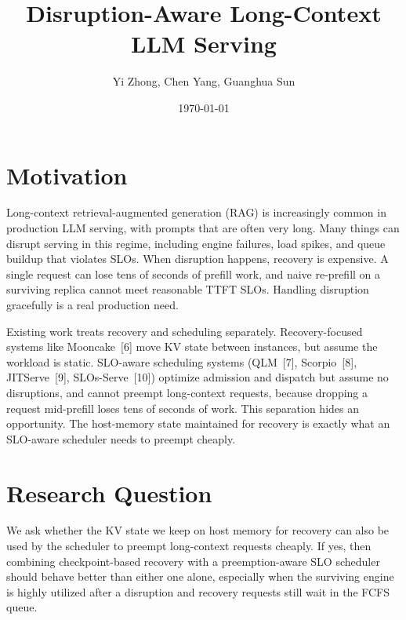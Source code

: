 \documentclass[11pt]{article}
\title{Disruption-Aware Long-Context LLM Serving }
\author{Yi Zhong, Chen Yang, Guanghua Sun}
\date{\today}
\begin{document}
\maketitle
 
\section*{Motivation}
Long-context retrieval-augmented generation (RAG) is increasingly common in production LLM serving, with prompts that are often very long. Many things can disrupt serving in this regime, including engine failures, load spikes, and queue buildup that violates SLOs. When disruption happens, recovery is expensive. A single request can lose tens of seconds of prefill work, and naive re-prefill on a surviving replica cannot meet reasonable TTFT SLOs. Handling disruption gracefully is a real production need.
 
Existing work treats recovery and scheduling separately. Recovery-focused systems like Mooncake~[6] move KV state between instances, but assume the workload is static. SLO-aware scheduling systems (QLM~[7], Scorpio~[8], JITServe~[9], SLOs-Serve~[10]) optimize admission and dispatch but assume no disruptions, and cannot preempt long-context requests, because dropping a request mid-prefill loses tens of seconds of work. This separation hides an opportunity. The host-memory state maintained for recovery is exactly what an SLO-aware scheduler needs to preempt cheaply.
 
\section*{Research Question}
We ask whether the KV state we keep on host memory for recovery can also be used by the scheduler to preempt long-context requests cheaply. If yes, then combining checkpoint-based recovery with a preemption-aware SLO scheduler should behave better than either one alone, especially when the surviving engine is highly utilized after a disruption and recovery requests still wait in the FCFS queue.
 
\end{document}
